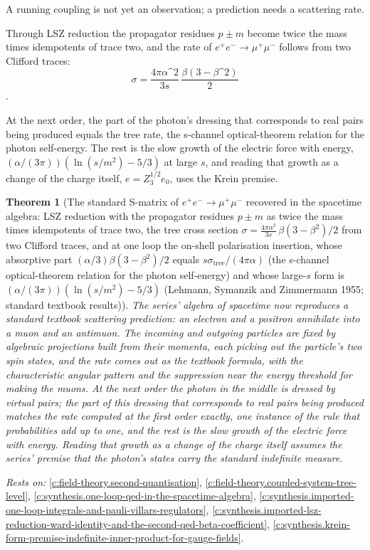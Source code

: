 \documentclass[11pt]{article}
\newtheorem{theorem}{Theorem}[section]
\theoremstyle{definition}
\theoremstyle{plain}
\begin{document}
A running coupling is not yet an observation; a prediction needs a scattering rate.

Through LSZ reduction the propagator residues $p \pm m$ become twice the mass times idempotents of trace two, and the rate of $e^{+}e^{-} \to \mu^{+}\mu^{-}$ follows from two Clifford traces: \[ \sigma = \frac{4\pi\alpha\^{}{2}}{3s}\,\frac{\beta(3 - \beta\^{}{2})}{2} \].

At the next order, the part of the photon's dressing that corresponds to real pairs being produced equals the tree rate, the s-channel optical-theorem relation for the photon self-energy. The rest is the slow growth of the electric force with energy, $(\alpha/(3\pi))(\ln(s/m^{2}) - 5/3)$ at large $s$, and reading that growth as a change of the charge itself, $e = Z_{3}^{1/2}e_{0}$, uses the Krein premise.

\begin{theorem}[The standard S-matrix of $e^{+}e^{-} \to \mu^{+}\mu^{-}$ recovered in the spacetime algebra: LSZ reduction with the propagator residues $p \pm m$ as twice the mass times idempotents of trace two, the tree cross section $\sigma = \tfrac{4\pi\alpha^{2}}{3s}\,\beta(3 - \beta^{2})/2$ from two Clifford traces, and at one loop the on-shell polarisation insertion, whose absorptive part $(\alpha/3)\beta(3 - \beta^{2})/2$ equals $s\sigma_{\mathrm{tree}}/(4\pi\alpha)$ (the s-channel optical-theorem relation for the photon self-energy) and whose large-$s$ form is $(\alpha/(3\pi))(\ln(s/m^{2}) - 5/3)$ (Lehmann, Symanzik and Zimmermann 1955; standard textbook results)]\label{c:synthesis.electron-positron-to-muon-pairs-in-the-spacetime-algebra-lsz-tree-cross-section-and-one-loop-unitarity}
The series' algebra of spacetime now reproduces a standard textbook scattering prediction: an electron and a positron annihilate into a muon and an antimuon. The incoming and outgoing particles are fixed by algebraic projections built from their momenta, each picking out the particle's two spin states, and the rate comes out as the textbook formula, with the characteristic angular pattern and the suppression near the energy threshold for making the muons. At the next order the photon in the middle is dressed by virtual pairs; the part of this dressing that corresponds to real pairs being produced matches the rate computed at the first order exactly, one instance of the rule that probabilities add up to one, and the rest is the slow growth of the electric force with energy. Reading that growth as a change of the charge itself assumes the series' premise that the photon's states carry the standard indefinite measure.
\end{theorem}
\noindent\emph{Rests on:} \ref{c:field-theory.second-quantisation}, \ref{c:field-theory.coupled-system-tree-level}, \ref{c:synthesis.one-loop-qed-in-the-spacetime-algebra}, \ref{c:synthesis.imported-one-loop-integrals-and-pauli-villars-regulators}, \ref{c:synthesis.imported-lsz-reduction-ward-identity-and-the-second-qed-beta-coefficient}, \ref{c:synthesis.krein-form-premise-indefinite-inner-product-for-gauge-fields}.
\end{document}
